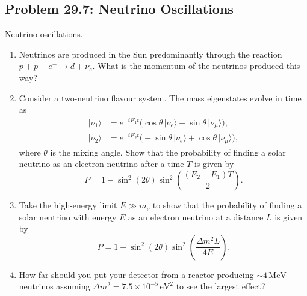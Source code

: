 \documentclass[a4paper,11pt]{article}
\begin{document}
\subsection[Problem 29.7: Neutrino oscillations]{Problem 29.7: Neutrino Oscillations}

Neutrino oscillations.

\begin{enumerate}
  \item Neutrinos are produced in the Sun predominantly through the reaction
  $p+p+e^-\to d+\nu_e$. What is the momentum of the neutrinos produced this
  way?

  \item Consider a two-neutrino flavour system. The mass eigenstates evolve in
  time as
  \begin{align}
    |\nu_1\rangle
      &=e^{-iE_1t}\bigl(\cos\theta\,|\nu_e\rangle
        +\sin\theta\,|\nu_\mu\rangle\bigr),\\
    |\nu_2\rangle
      &=e^{-iE_2t}\bigl(-\sin\theta\,|\nu_e\rangle
        +\cos\theta\,|\nu_\mu\rangle\bigr),
  \end{align}
  where $\theta$ is the mixing angle. Show that the probability of finding a
  solar neutrino as an electron neutrino after a time $T$ is given by
  \begin{equation}
    P=1-\sin^2(2\theta)\sin^2\!\left(\frac{(E_2-E_1)T}{2}\right).
    \label{eq:b}
  \end{equation}

  \item Take the high-energy limit $E\gg m_\nu$ to show that the
  probability of finding a solar neutrino with energy $E$ as an electron
  neutrino at a distance $L$ is given by
  \begin{equation}
    P=1-\sin^2(2\theta)\sin^2\!\left(\frac{\Delta m^2L}{4E}\right).
  \end{equation}

  \item How far should you put your detector from a reactor producing
  $\sim4\,\mathrm{MeV}$ neutrinos assuming
  $\Delta m^2=7.5\times10^{-5}\,\mathrm{eV}^2$ to see the largest effect?
\end{enumerate}
\end{document}
